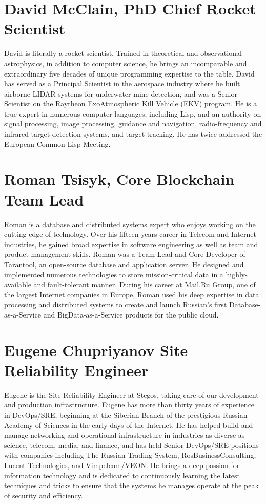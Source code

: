 \documentclass[8pt,fleqn,openany]{book}
\begin{document}
\section{David McClain, PhD Chief Rocket Scientist}
David is literally a rocket scientist. Trained in theoretical and observational astrophysics, in addition to computer science, he brings an incomparable and extraordinary five decades of unique programming expertise to the table. David has served as a Principal Scientist in the aerospace industry where he built airborne LIDAR systems for underwater mine detection, and was a Senior Scientist on the Raytheon ExoAtmospheric Kill Vehicle (EKV) program. He is a true expert in numerous computer languages, including Lisp, and an authority on signal processing, image processing, guidance and navigation, radio-frequency and infrared target detection systems, and target tracking. He has twice addressed the European Common Lisp Meeting. 

\section{Roman Tsisyk, Core Blockchain Team Lead}
Roman is a database and distributed systems expert who enjoys working on the cutting edge of technology. Over his fifteen-years career in Telecom and Internet industries, he gained broad expertise in software engineering as well as team and product management skills. Roman was a Team Lead and Core Developer of Tarantool, an open-source database and application server. He designed and implemented numerous technologies to store mission-critical data in a highly-available and fault-tolerant manner. During his career at Mail.Ru Group, one of the largest Internet companies in Europe, Roman used his deep expertise in data processing and distributed systems to create and launch Russian’s first Database-as-a-Service and BigData-as-a-Service products for the public cloud. 

\section{Eugene Chupriyanov Site Reliability Engineer}
Eugene is the Site Reliability Engineer at Stegos, taking care of our development and production infrastructure. Eugene has more than thirty years of experience in DevOps/SRE, beginning at the Siberian Branch of the prestigious Russian Academy of Sciences in the early days of the Internet. He has helped build and manage networking and operational infrastructure in industries as diverse as science, telecom, media, and finance, and has held Senior DevOps/SRE positions with companies including The Russian Trading System, RosBusinessConsulting, Lucent Technologies, and Vimpelcom/VEON. He brings a deep passion for information technology and is dedicated to continuously learning the latest techniques and tricks to ensure that the systems he manages operate at the peak of security and efficiency. 
\end{document}
